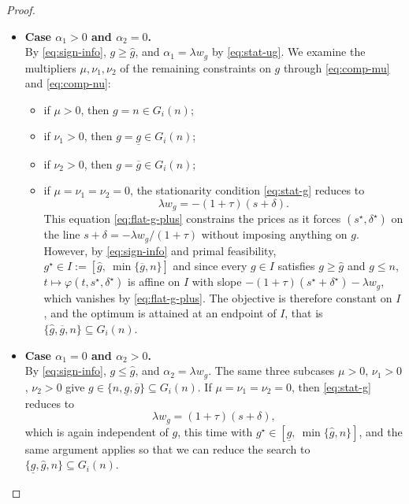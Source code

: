 \documentclass[11pt]{article}
\theoremstyle{plain}
\theoremstyle{definition}
\begin{document}
\begin{proof}
\begin{itemize}
    \item \textbf{Case $\alpha_1>0$ and $\alpha_2=0$.}\\
    By \eqref{eq:sign-info}, $g\ge\widehat g$, and $\alpha_1=\lambda w_g$ by \eqref{eq:stat-ug}. 
    We examine the multipliers $\mu,\nu_1,\nu_2$ of the remaining constraints on $g$ through \eqref{eq:comp-mu} and \eqref{eq:comp-nu}:
    \begin{itemize}
        \item if $\mu>0$, then $\boxed{g=n}\in G_i(n)$;
        \item if $\nu_1>0$, then $\boxed{g=\underline g}\in G_i(n)$;
        \item if $\nu_2>0$, then $\boxed{g=\overline g}\in G_i(n)$;
        \item if $\mu=\nu_1=\nu_2=0$, the stationarity condition
        \eqref{eq:stat-g} reduces to
        \begin{equation}
            \label{eq:flat-g-plus}
            \lambda w_g=-(1+\tau)(s+\delta).
        \end{equation}
        This equation \eqref{eq:flat-g-plus} constrains the prices as it forces $(s^\star,\delta^\star)$ on the line $s+\delta=-\lambda w_g/(1+\tau)$ without imposing anything on $g$.
        However, by \eqref{eq:sign-info} and primal feasibility, $g^\star\in I:=[\widehat g,\ \min\{\overline g,n\}]$ and since every $g\in I$ satisfies $g\ge\widehat g$ and $g\le n$, $t\mapsto\varphi(t,s^\star,\delta^\star)$ is affine on $I$ with slope $-(1+\tau)(s^\star+\delta^\star)-\lambda w_g$, which vanishes by \eqref{eq:flat-g-plus}. 
        The objective is therefore constant on $I$, and the optimum is attained at an endpoint of $I$, that is $\{\widehat g,\overline g,n\}\subseteq G_i(n)$.
    \end{itemize}
 
    \item \textbf{Case $\alpha_1=0$ and $\alpha_2>0$.}\\
    By \eqref{eq:sign-info}, $g\le\widehat g$, and $\alpha_2=\lambda w_g$. 
    The same three subcases $\mu>0$, $\nu_1>0$, $\nu_2>0$ give $g\in\{n,\underline g,\overline g\}\subseteq G_i(n)$. 
    If $\mu=\nu_1=\nu_2=0$, then \eqref{eq:stat-g} reduces to
    \begin{equation}
        \label{eq:flat-g-minus}
        \lambda w_g=(1+\tau)(s+\delta),
    \end{equation}
    which is again independent of $g$, this time with $g^\star\in[\underline g,\ \min\{\widehat g,n\}]$, and the same argument applies so that we can reduce the search to $\{\underline g,\widehat g,n\}\subseteq G_i(n)$.
 

\end{itemize}
\end{proof}
\end{document}
